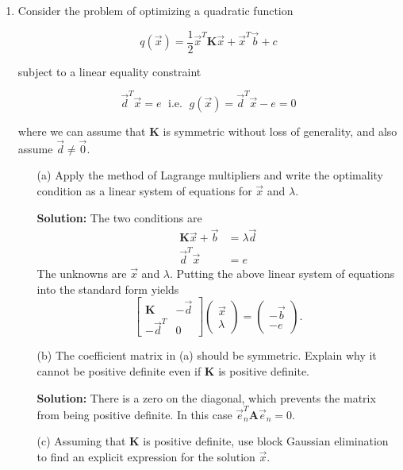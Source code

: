 \documentclass[11pt,fleqn]{article}
\begin{document}
\begin{enumerate}
\item Consider the problem of optimizing a quadratic function 

$$q(\vec{x}) = \frac{1}{2}\vec{x}^T\mathbf{K}\vec{x} + \vec{x}^T\vec{b} + c $$

subject to a linear equality constraint

$$\vec{d}^T\vec{x} = e\;\text{ i.e. }\;g(\vec{x}) = \vec{d}^T\vec{x} - e= 0$$

where we can assume that $\mathbf{K}$ is symmetric without loss of generality, and also assume $\vec{d}\neq\vec{0}$.

	\begin{itemize}
	\item[(a)] Apply the method of Lagrange multipliers and write the optimality condition as a linear system of equations for $\vec{x}$ and $\lambda$.
	
	{\bf Solution:} The two conditions are
	\begin{eqnarray*}
	\mathbf{K}\vec{x}  +\vec{b} &= \lambda \vec{d}\\
	\vec{d}^T\vec{x} &= e
	\end{eqnarray*}
	The unknowns are $\vec{x}$ and $\lambda$. Putting the above linear system of equations into the standard form yields
	\[\left[\begin{array}{c|c}\mathbf{K}&-\vec{d}\\\hline -\vec{d}^T&0\end{array}\right]\left(\begin{array}{c}\vec{x}\\\lambda\end{array}\right) = \left(\begin{array}{c}-\vec{b}\\-e\end{array}\right).\]
	\item[(b)] The coefficient matrix in (a) should be symmetric. Explain why it cannot be positive definite even if $\mathbf{K}$ is positive definite.
	
	{\bf Solution:} There is a zero on the diagonal, which prevents the matrix from being positive definite. In this case $\vec{e}_n^T\mathbf{A}\vec{e}_n=0$.
	\item[(c)] Assuming that $\mathbf{K}$ is positive definite, use block Gaussian elimination to find an explicit expression for the solution $\vec{x}$.
	

\end{itemize}
\end{enumerate}
\end{document}
